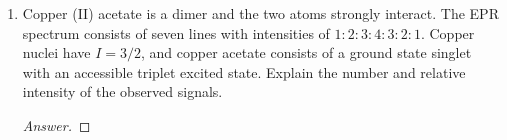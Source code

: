 \documentclass[../psets.tex]{subfiles}
\begin{document}
\begin{enumerate}
\begin{enumerate}
\begin{proof}[Answer]
        \end{proof}
    \end{enumerate}
    \item Copper (II) acetate is a dimer and the two  atoms strongly interact. The EPR spectrum consists of seven lines with intensities of $1:2:3:4:3:2:1$. Copper nuclei have $I=3/2$, and copper acetate consists of a ground state singlet with an accessible triplet excited state. Explain the number and relative intensity of the observed signals.
    \begin{proof}[Answer]





\end{proof}
\end{enumerate}
\end{document}
